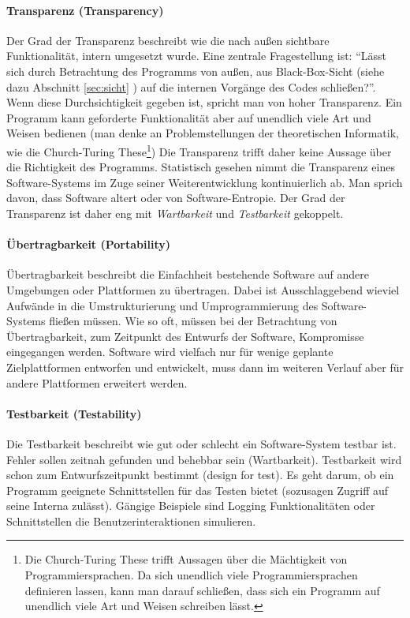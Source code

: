 \paragraph{Transparenz (Transparency)} Der Grad der Transparenz beschreibt wie die nach außen sichtbare Funktionalität, intern umgesetzt wurde. Eine zentrale Fragestellung ist: ``Lässt sich durch Betrachtung des Programms von außen, aus Black-Box-Sicht (siehe dazu Abschnitt \ref{sec:sicht} ) auf die internen Vorgänge des Codes schließen?''. Wenn diese Durchsichtigkeit gegeben ist, spricht man von hoher Transparenz. Ein Programm kann geforderte Funktionalität aber auf unendlich viele Art und Weisen bedienen (man denke an Problemstellungen der theoretischen Informatik, wie die Church-Turing These\footnote{Die Church-Turing These trifft Aussagen über die Mächtigkeit von Programmiersprachen\cite{hoffmann_theoretische_2011}. Da sich unendlich viele Programmiersprachen definieren lassen, kann man darauf schließen, dass sich ein Programm auf unendlich viele Art und Weisen schreiben lässt.}) Die Transparenz trifft daher keine Aussage über die Richtigkeit des Programms. Statistisch gesehen nimmt die Transparenz eines Software-Systems im Zuge seiner Weiterentwicklung kontinuierlich ab\cite{hoffmann_software-qualitat_2013}. Man sprich davon, dass Software altert oder von Software-Entropie. Der Grad der Transparenz ist daher eng mit \textit{Wartbarkeit} und \textit{Testbarkeit} gekoppelt. 

\paragraph{Übertragbarkeit (Portability)} Übertragbarkeit beschreibt die Einfachheit bestehende Software auf andere Umgebungen oder Plattformen zu übertragen. Dabei ist Ausschlaggebend wieviel Aufwände in die Umstrukturierung und Umprogrammierung des Software-Systems fließen müssen. Wie so oft, müssen bei der Betrachtung von Übertragbarkeit, zum Zeitpunkt des Entwurfs der Software, Kompromisse eingegangen werden. Software wird vielfach nur für wenige geplante Zielplattformen entworfen und entwickelt, muss dann im weiteren Verlauf aber für andere Plattformen erweitert werden.

\paragraph{Testbarkeit (Testability)} Die Testbarkeit beschreibt wie gut oder schlecht ein Software-System testbar ist. Fehler sollen zeitnah gefunden und behebbar sein (Wartbarkeit). Testbarkeit wird schon zum Entwurfszeitpunkt bestimmt (design for test). Es geht darum, ob ein Programm geeignete Schnittstellen für das Testen bietet (sozusagen Zugriff auf seine Interna zulässt). Gängige Beispiele sind Logging Funktionalitäten oder Schnittstellen die Benutzerinteraktionen simulieren.

